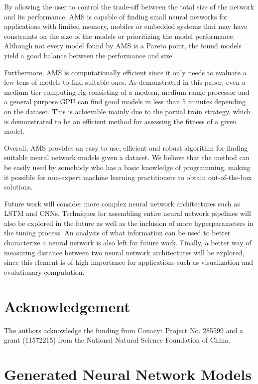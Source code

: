 \documentclass[preprint,12pt]{elsarticle}%
\begin{document}
By allowing the user to control the trade-off between the total size of the network and its performance, AMS is capable of finding small neural networks for applications with limited memory, mobiles or embedded systems that may have constraints on the size of the models or prioritizing the model performance. Although not every model found by AMS is a Pareto point, the found models yield a good balance between the performance and size.

Furthermore, AMS is computationally efficient since it only needs to evaluate a few tens of models to find suitable ones. As demonstrated in this paper, even a medium tier computing rig consisting of a modern, medium-range processor and a general purpose GPU can find good models in less than 5 minutes depending on the dataset. This is achievable mainly due to the partial train strategy, which is demonstrated to be an efficient method for assessing the fitness of a given model.

Overall, AMS provides an easy to use, efficient and robust algorithm for finding suitable neural network models given a dataset. We believe that the method can be easily used by somebody who has a basic knowledge of programming, making it possible for non-expert machine learning practitioners to obtain out-of-the-box solutions.

Future work will consider more complex neural network architectures such as LSTM and CNNs. Techniques for assembling entire neural network pipelines will also be explored in the future as well as the inclusion of more hyperparameters in the tuning process. An analysis of what information can be used to better characterize a neural network is also left for future work. Finally, a better way of measuring distance between two neural network architectures will be explored, since this element is of high importance for applications such as visualization and evolutionary computation.


\section*{Acknowledgement}
The authors acknowledge the funding from Conacyt Project No. 285599 and a grant (11572215) from the National Natural Science Foundation of China.





\clearpage
\appendix

\section{Generated Neural Network Models}
\label{appendix:generated_models}
\end{document}
